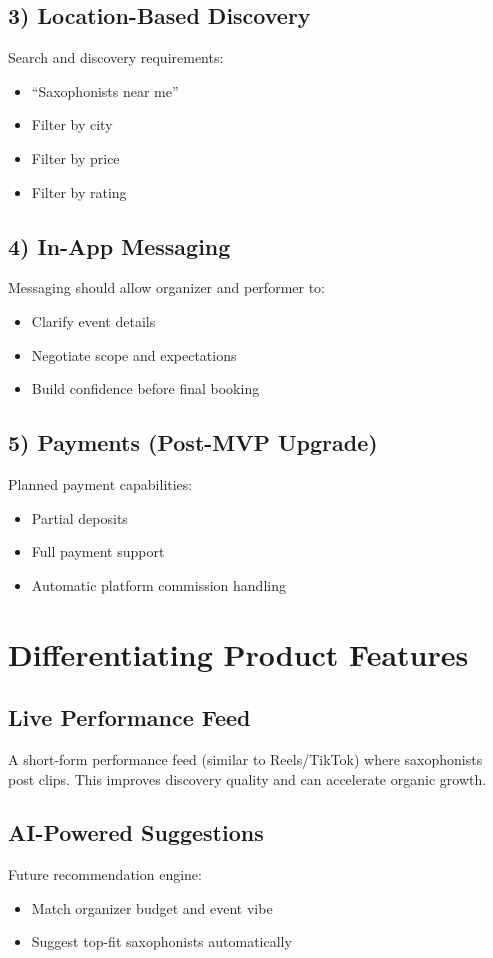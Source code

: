 \documentclass[11pt,a4paper]{article}
\begin{document}
\subsection{3) Location-Based Discovery}
Search and discovery requirements:
\begin{itemize}[leftmargin=1.5em]
    \item ``Saxophonists near me''
    \item Filter by city
    \item Filter by price
    \item Filter by rating
\end{itemize}

\subsection{4) In-App Messaging}
Messaging should allow organizer and performer to:
\begin{itemize}[leftmargin=1.5em]
    \item Clarify event details
    \item Negotiate scope and expectations
    \item Build confidence before final booking
\end{itemize}

\subsection{5) Payments (Post-MVP Upgrade)}
Planned payment capabilities:
\begin{itemize}[leftmargin=1.5em]
    \item Partial deposits
    \item Full payment support
    \item Automatic platform commission handling
\end{itemize}

\section{Differentiating Product Features}

\subsection{Live Performance Feed}
A short-form performance feed (similar to Reels/TikTok) where saxophonists post clips.
This improves discovery quality and can accelerate organic growth.

\subsection{AI-Powered Suggestions}
Future recommendation engine:
\begin{itemize}[leftmargin=1.5em]
    \item Match organizer budget and event vibe
    \item Suggest top-fit saxophonists automatically
\end{itemize}
\end{document}
